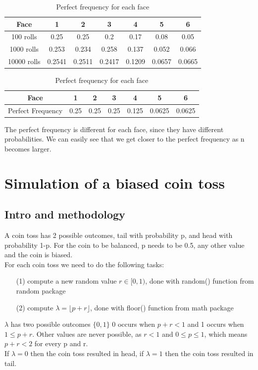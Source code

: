 \documentclass[a4paper]{article}
\begin{document}
\begin{table}[H]
\begin{center}
\begin{tabular}{|c|c|c|c|c|c|c|}
\hline
Face        & 1      & 2      & 3      & 4      & 5      & 6      \\ \hline
100 rolls   & 0.25   & 0.25   & 0.2    & 0.17   & 0.08   & 0.05   \\ \hline
1000 rolls  & 0.253  & 0.234  & 0.258  & 0.137  & 0.052  & 0.066  \\ \hline
10000 rolls & 0.2541 & 0.2511 & 0.2417 & 0.1209 & 0.0657 & 0.0665 \\ \hline
\end{tabular}
\caption*{\label{BD} Frequency of each face for different number of rolls}
\vspace{0.6cm}
\begin{tabular}{|c|c|c|c|c|c|c|}
\hline
Face              & 1    & 2    & 3    & 4     & 5      & 6      \\ \hline
Perfect Frequency & 0.25 & 0.25 & 0.25 & 0.125 & 0.0625 & 0.0625 \\ \hline
\end{tabular}
\caption*{\label{BD} Perfect frequency for each face}
\end{center}
\end{table}
The perfect frequency is different for each face, since they have different probabilities. We can easily see that we get closer to the perfect frequency as n becomes larger.\\


\newpage
\section*{Simulation of a biased coin toss}
\subsection*{Intro and methodology}
A coin toss has 2 possible outcomes, tail with probability p, and head with probability 1-p. For the coin to be balanced, p needs to be 0.5, any other value and the coin is biased.\\
For each coin toss we need to do the following tasks:
\begin{itemize}
\item [(1)] compute a new random value $r \in [0,1)$, done with random() function from random package
\item [(2)] compute $\lambda = \lfloor p + r \rfloor$, done with floor() function from math package
\end{itemize}
$\lambda$ has two possible outcomes $\{0, 1\}$ 0 occurs when $p + r < 1$ and 1 occurs when $1 \leq p + r$. Other values are never possible, as $r < 1$ and $0 \leq p \leq 1$, which means $p + r < 2$ for every p and r.\\
If $\lambda = 0$ then the coin toss resulted in head, if $\lambda = 1$ then the coin toss resulted in tail.
\end{document}
